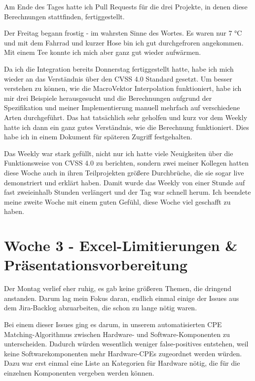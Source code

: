Am Ende des Tages hatte ich Pull Requests für die drei Projekte, in denen diese Berechnungen stattfinden, fertiggestellt.

Der Freitag begann frostig - im wahrsten Sinne des Wortes.
Es waren nur 7 °C und mit dem Fahrrad und kurzer Hose bin ich gut durchgefroren angekommen.
Mit einem Tee konnte ich mich aber ganz gut wieder aufwärmen.

Da ich die Integration bereits Donnerstag fertiggestellt hatte, habe ich mich wieder an das Verständnis über den CVSS 4.0 Standard gesetzt.
Um besser verstehen zu können, wie die MacroVektor Interpolation funktioniert, habe ich mir drei Beispiele herausgesucht und die Berechnungen aufgrund der Spezifikation und meiner Implementierung manuell mehrfach auf verschiedene Arten durchgeführt.
Das hat tatsächlich sehr geholfen und kurz vor dem Weekly hatte ich dann ein ganz gutes Verständnis, wie die Berechnung funktioniert.
Dies habe ich in einem Dokument für späteren Zugriff festgehalten.

Das Weekly war stark gefüllt, nicht nur ich hatte viele Neuigkeiten über die Funktionsweise von CVSS 4.0 zu berichten, sondern zwei meiner Kollegen hatten diese Woche auch in ihren Teilprojekten größere Durchbrüche, die sie sogar live demonstriert und erklärt haben.
Damit wurde das Weekly von einer Stunde auf fast zweieinhalb Stunden verlängert und der Tag war schnell herum.
Ich beendete meine zweite Woche mit einem guten Gefühl, diese Woche viel geschafft zu haben.


\section{Woche 3 - Excel-Limitierungen \& Präsentationsvorbereitung} \label{sec:bericht-wo-3}

Der Montag verlief eher ruhig, es gab keine größeren Themen, die dringend anstanden.
Darum lag mein Fokus daran, endlich einmal einige der Issues aus dem Jira-Backlog abzuarbeiten, die schon zu lange nötig waren.

Bei einem dieser Issues ging es darum, in unserem automatisierten CPE Matching-Algorithmus zwischen Hardware- und Software-Komponenten zu unterscheiden.
Dadurch würden wesentlich weniger false-positives entstehen, weil keine Softwarekomponenten mehr Hardware-CPEs zugeordnet werden würden.
Dazu war erst einmal eine Liste an Kategorien für Hardware nötig, die für die einzelnen Komponenten vergeben werden können.


